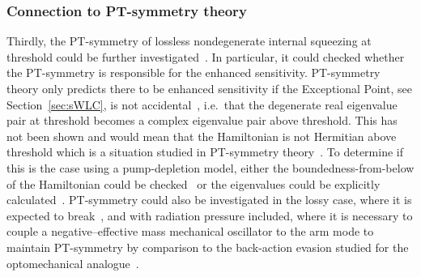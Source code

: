 \subsubsection{Connection to PT-symmetry theory}

Thirdly, the PT-symmetry of lossless nondegenerate internal squeezing at threshold could be further investigated~\cite{CMBPersonalCommunication}. In particular, it could checked whether the PT-symmetry is responsible for the enhanced sensitivity.
PT-symmetry theory only predicts there to be enhanced sensitivity if the Exceptional Point, see Section~\ref{sec:sWLC}, is not accidental~\cite{}, i.e.\ that the degenerate real eigenvalue pair at threshold becomes a complex eigenvalue pair above threshold. This has not been shown and would mean that the Hamiltonian is not Hermitian above threshold which is a situation studied in PT-symmetry theory~\cite{}. To determine if this is the case using a pump-depletion model, either the boundedness-from-below of the Hamiltonian could be checked~\cite{} or the eigenvalues could be explicitly calculated~\cite{}.
PT-symmetry could also be investigated in the lossy case, where it is expected to break~\cite{}, and with radiation pressure included, where it is necessary to couple a negative--effective mass mechanical oscillator to the arm mode to maintain PT-symmetry by comparison to the back-action evasion studied for the optomechanical analogue~\cite{liBroadbandSensitivityImprovement2020}.

